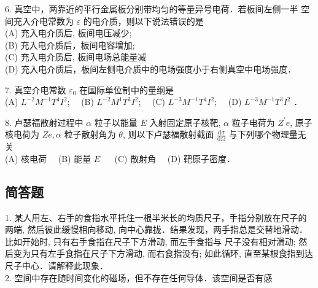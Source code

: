 6. 真空中，两靠近的平行金属板分别带均匀的等量异号电荷．若板间左侧一半 空间充入介电常数为 $\varepsilon$ 的电介质，则以下说法错误的是 \\
(A) 充入电介质后, 板间电压减少;\\
(B) 充入电介质后，板间电容增加;\\
(C) 充入电介质后, 板间电场总能量减\\
(D) 充入电介质后，板间左侧电介质中的电场强度小于右侧真空中电场强度．

7. 真空介电常数 $\varepsilon_{0}$ 在国际单位制中的量纲是\\
(A) $L^{-2} M^{-1} T^{4} I^{2}$;$\quad$
(B) $L^{-2} M^{1} T^{3} I^{2}$;$\quad$
(C) $L^{-3} M^{-1} T^{4} I^{2}$;$\quad$
(D) $L^{-3} M^{-1} T^{3} I^{2}$ ．

8. 卢瑟福散射过程中 $\alpha$ 粒子以能量 $E$ 入射固定原子核靶, $\alpha$ 粒子电荷为 $Z^{\prime} e$, 原子核电荷为 $Z e, \alpha$ 粒子散射角为 $\theta$, 则以下卢瑟福散射截面 $\frac{\mathrm{d} \sigma}{\mathrm{d} \Omega}$ 与下列哪个物理量无关\\
(A) 核电荷$\quad$
(B) 能量 $E$ $\quad$
(C) 散射角$\quad$
(D) 靶原子密度．
\subsection{简答题}
1.  某人用左、右手的食指水平托住一根半米长的均质尺子，手指分别放在尺子的两端, 然后彼此缓慢相向移动, 向中心靠拢．结果发现，两手指总是交替地滑动．比如开始时, 只有右手食指在尺子下方滑动, 而左手食指与 尺子没有相对滑动; 然后变为只有左手食指在尺子下方滑动, 而右食指没有; 如此循环, 直至某根食指到达尺子中心．请解释此现象．\\
2. 空间中存在随时间变化的磁场，但不存在任何导体．该空间是否有感